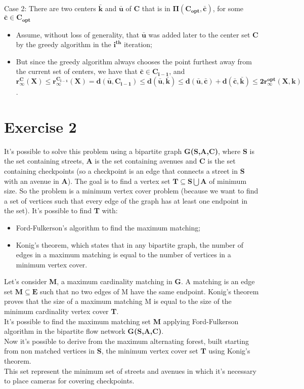 \documentclass[11pt]{article}
\begin{document}
Case 2: There are two centers $\mathbf{\bar{k}}$ and $\mathbf{\bar{u}}$ of $\mathbf{C}$ that is in $\mathbf{\Pi(C_{opt},\bar{c})}$, for some $\mathbf{\bar{c} \in C_{opt}}$
\begin{itemize}
	\item Assume, without loss of generality, that $\mathbf{\bar{u}}$ was added later to the center set $\mathbf{C}$ by the greedy algorithm in the $\mathbf{i^{th}}$ iteration;
	\item But since the greedy algorithm always chooses the point furthest away from the current set of centers, we have that $\mathbf{\bar{c} \in C_{i-1}}$, and \\ $\mathbf{r^{C}_{\infty}(X) \le r^{C_{i-1}}_{\infty}(X) = d(\bar{u},C_{i-1}) \le d(\bar{u},\bar{k}) \le d(\bar{u},\bar{c}) + d(\bar{c},\bar{k}) \le 2r^{opt}_{\infty}(X,k)}$.
\end{itemize}

\section{Exercise 2}
It's possible to solve this problem using a bipartite graph \textbf{G(S,A,C)}, where \textbf{S} is the set containing streets, \textbf{A} is the set containing avenues and \textbf{C} is the set containing checkpoints (so a checkpoint is an edge that connects a street in \textbf{S} with an avenue in \textbf{A}).
The goal is to find a vertex set $\mathbf{T \subseteq S \bigcup A}$ of minimum size.
So the problem is a minimum vertex cover problem
(because we want to find a set of vertices such that every edge of the graph
has at least one endpoint in the set). It's possible to find \textbf{T} with:
\begin{itemize}
	\item Ford-Fulkerson’s algorithm to find the maximum matching;
	\item Konig's theorem, which states that in any bipartite graph, the number of edges in a maximum matching is equal to the number of vertices in a minimum vertex cover.
\end{itemize}
Let’s consider \textbf{M}, a maximum cardinality matching in \textbf{G}. A matching is an edge set $\mathbf{M \subseteq E}$ such that no two edges of M have the same endpoint. Konig's theorem proves that the size of a
maximum matching M is equal to the size of the minimum cardinality vertex cover \textbf{T}. \\
It's possible to find the maximum matching set \textbf{M} applying Ford-Fulkerson algorithm in the bipartite flow network \textbf{G(S,A,C)}.
\\
Now it's possible to derive from the maximum alternating forest, built starting
from non matched vertices in \textbf{S}, the minimum vertex cover set \textbf{T} using Konig's theorem.\\ 
This set represent the minimum
set of streets and avenues in which it's necessary to place cameras for covering checkpoints.
\end{document}
